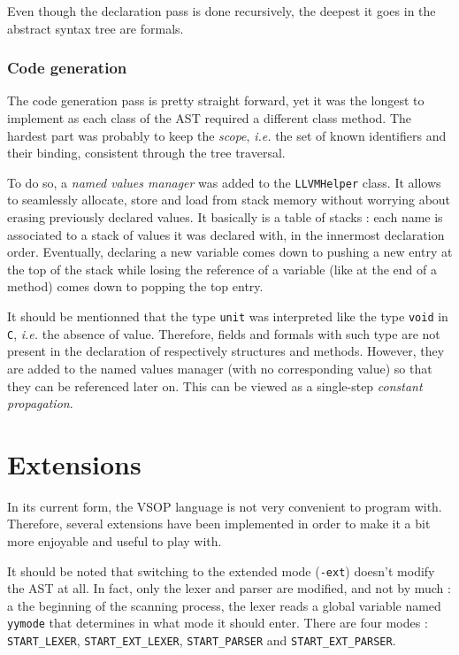 \documentclass[a4paper, 12pt]{article}
\begin{document}
	\begin{note}
	Even though the declaration pass is done recursively, the deepest it goes in the abstract syntax tree are formals. 
	\end{note}
	
	\subsubsection{Code generation}
	
	The code generation pass is pretty straight forward, yet it was the longest to implement as each class of the AST required a different class method. The hardest part was probably to keep the \emph{scope}, \emph{i.e.} the set of known identifiers and their binding, consistent through the tree traversal.
	
	To do so, a \emph{named values manager} was added to the \texttt{LLVMHelper} class. It allows to seamlessly allocate, store and load from stack memory without worrying about erasing previously declared values. It basically is a table of stacks : each name is associated to a stack of values it was declared with, in the innermost declaration order. Eventually, declaring a new variable comes down to pushing a new entry at the top of the stack while losing the reference of a variable (like at the end of a method) comes down to popping the top entry.
	
	It should be mentionned that the type \lstinline[style=vsop]{unit} was interpreted like the type \lstinline[style=vsop]{void} in \texttt{C}, \emph{i.e.} the absence of value. Therefore, fields and formals with such type are not present in the declaration of respectively structures and methods. However, they are added to the named values manager (with no corresponding value) so that they can be referenced later on. This can be viewed as a single-step \emph{constant propagation}.
	
	\section{Extensions}
	
	In its current form, the VSOP language is not very convenient to program with. Therefore, several extensions have been implemented in order to make it a bit more enjoyable and useful to play with.
	
	It should be noted that switching to the extended mode (\texttt{-ext}) doesn't modify the AST at all. In fact, only the lexer and parser are modified, and not by much : a the beginning of the scanning process, the lexer reads a global variable named \texttt{yymode} that determines in what mode it should enter. There are four modes : \texttt{START\_LEXER}, \texttt{START\_EXT\_LEXER}, \texttt{START\_PARSER} and \texttt{START\_EXT\_PARSER}.
	
\end{document}
